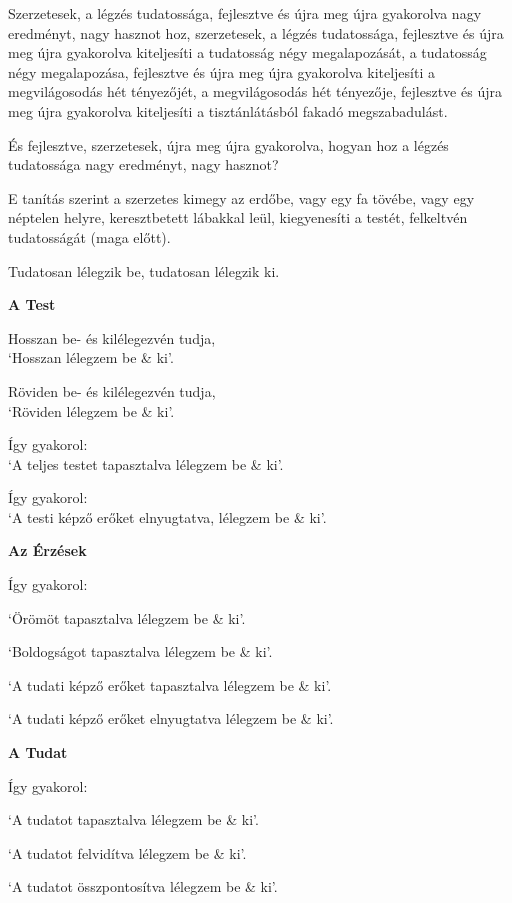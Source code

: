 {
\setlength{\parindent}{0pt}\setlength{\parskip}{5pt}
\fontsize{9.5}{14}\selectfont

Szerzetesek, a légzés tudatossága, fejlesztve és újra meg újra gyakorolva nagy
eredményt, nagy hasznot hoz, szerzetesek, a légzés tudatossága, fejlesztve és
újra meg újra gyakorolva kiteljesíti a tudatosság négy megalapozását, a
tudatosság négy megalapozása, fejlesztve és újra meg újra gyakorolva kiteljesíti
a megvilágosodás hét tényezőjét, a megvilágosodás hét tényezője, fejlesztve és
újra meg újra gyakorolva kiteljesíti a tisztánlátásból fakadó megszabadulást.

És fejlesztve, szerzetesek, újra meg újra gyakorolva, hogyan hoz a légzés
tudatossága nagy eredményt, nagy hasznot?

E tanítás szerint a szerzetes kimegy az erdőbe, vagy egy fa tövébe, vagy egy
néptelen helyre, keresztbetett lábakkal leül, kiegyenesíti a testét, felkeltvén
tudatosságát (maga előtt).

Tudatosan lélegzik be, tudatosan lélegzik ki.

\textbf{A Test}

Hosszan be- és kilélegezvén tudja,\\ `Hosszan lélegzem be \& ki'.

Röviden be- és kilélegezvén tudja,\\ `Röviden lélegzem be \& ki'.

Így gyakorol:\\ `A teljes testet tapasztalva lélegzem be \& ki'.

Így gyakorol:\\ `A testi képző erőket elnyugtatva, lélegzem be \& ki'.

\clearpage

\textbf{Az Érzések}

Így gyakorol:

`Örömöt tapasztalva lélegzem be \& ki'.

`Boldogságot tapasztalva lélegzem be \& ki'.

`A tudati képző erőket tapasztalva lélegzem be \& ki'.

`A tudati képző erőket elnyugtatva lélegzem be \& ki'.

\textbf{A Tudat}

Így gyakorol:

`A tudatot tapasztalva lélegzem be \& ki'.

`A tudatot felvidítva lélegzem be \& ki'.

`A tudatot összpontosítva lélegzem be \& ki'.

}
